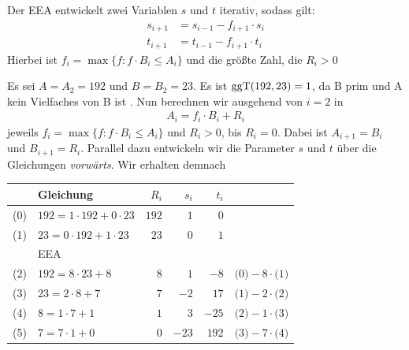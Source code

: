 Der EEA entwickelt zwei Variablen $s$ und $t$ iterativ, sodass gilt:
\begin{align*} s_{i+1} &= s_{i-1} - f_{i+1} \cdot s_{i}\\ t_{i+1} &=
                                                                    t_{i-1} - f_{i+1} \cdot t_{i}
\end{align*} Hierbei ist $f_i = \max \{f : f \cdot B_i \leq A_i\}$
und die größte Zahl, die $R_i > 0$
\begin{beispiel}[EEA] Es sei $A = A_2 = 192 $ und $B = B_2 = 23$. Es
  ist $\operatorname{ggT}(192, 23) = 1$, da B prim und A kein Vielfaches von B ist . Nun
  berechnen wir ausgehend von $i = 2$ in
  \begin{align*} A_i = f_i \cdot B_i + R_i
  \end{align*} jeweils $f_i = \max \{f : f \cdot B_i \leq A_i\}$ und
  $R_i > 0$, bis $R_i = 0$. Dabei ist $A_{i+1} = B_i$ und $B_{i+1} =
  R_i$. Parallel dazu entwickeln wir die Parameter $s$ und $t$ über die
  Gleichungen \emph{vorwärts}. Wir erhalten demnach
  \begin{table}[h] \centering \large
    \begin{tabular}[c]{|c|l|rrr|l|} \hline & Gleichung & $R_i$ & $s_i$
      & $t_i$ &\\ \hline \hline (0) & $192 = 1 \cdot 192 + 0 \cdot 23$ & $192$
                                                               & $1$ & $0$ &\\ (1) & $23 = 0 \cdot 192 + 1 \cdot 23$ & $23$ & $0$ & $1$
              &\\ \hline & EEA & & & &\\ \hline (2) & $192 = 8 \cdot 23 + 8$ & $8$ &
                                                                                     $1$ & $-8$ & $\text{(0)} - 8 \cdot \text{(1)}$\\ (3) & $23 = 2 \cdot 8 +
                                                                                                                                            7$ & $7$ & $-2$ & $17$ & $\text{(1)} - 2 \cdot \text{(2)}$\\ (4) & $8 =
                                                                                                                                                                                                               1 \cdot 7 + 1$ & $1$ & $3$ & $-25$ & $\text{(2)} - 1 \cdot \text{(3)}$\\
      (5) & $7 = 7 \cdot 1 + 0$ & $0$ & $-23$ & $192$ & $\text{(3)} - 7 \cdot
                                                        \text{(4)}$\\ \hline
    \end{tabular}
  \end{table}

\end{beispiel}
